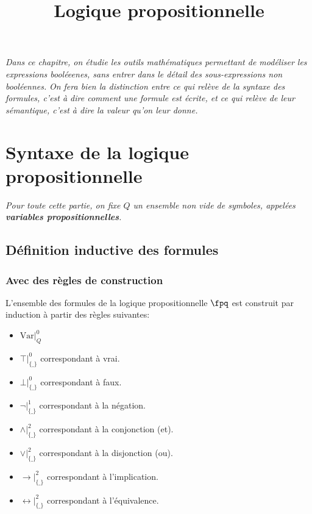 \documentclass{scrartcl}
\title{Logique propositionnelle}
\author{}
\date{}
\begin{document}
	\maketitle
	\textsl{Dans ce chapitre, on étudie les outils mathématiques permettant de modéliser les expressions booléeenes, sans entrer dans le détail des sous-expressions non booléennes.}
	\textsl{On fera bien la distinction entre ce qui relève de la syntaxe des formules, c'est à dire comment une formule est écrite, et ce qui relève de leur sémantique, c'est à dire la valeur qu'on leur donne.}
	\section{Syntaxe de la logique propositionnelle}
		\begin{center}\textsl{Pour toute cette partie, on fixe $Q$ un ensemble non vide de symboles, appelées \textbf{variables propositionnelles}.}\end{center}
		\subsection{Définition inductive des formules}
			\subsubsection{Avec des règles de construction}
				L'ensemble des formules de la logique propositionnelle $\fpq$ est construit par induction à partir des règles suivantes:
				
				\begin{multicols}{2}
				\begin{itemize}
					\item $\text{Var}\big|_Q^0$
					\item $\top\big|_{\{\_\}}^0$ correspondant à vrai.
					\item $\bot\big|_{\{\_\}}^0$ correspondant à faux.
					\item $\neg\big|_{\{\_\}}^1$ correspondant à la négation.
					\item $\wedge\big|_{\{\_\}}^2$ correspondant à la conjonction (et).
					\item $\vee\big|_{\{\_\}}^2$ correspondant à la disjonction (ou).
					\item $\rightarrow\big|_{\{\_\}}^2$ correspondant à l'implication.
					\item $\leftrightarrow\big|_{\{\_\}}^2$ correspondant à l'équivalence.
				\end{itemize}
				\end{multicols}
\end{document}
